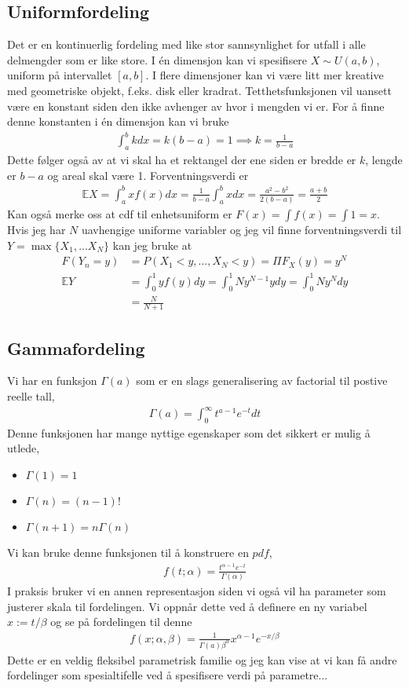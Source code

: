 \subsection{Uniformfordeling}
Det er en kontinuerlig fordeling med like stor sannsynlighet for utfall i alle delmengder som er like store. I én dimensjon kan vi spesifisere $X\sim U(a,b)$, uniform på intervallet $[a,b]$. I flere dimensjoner kan vi være litt mer kreative med geometriske objekt, f.eks. disk eller kradrat. Tetthetsfunksjonen vil uansett være en konstant siden den ikke avhenger av hvor i mengden vi er. For å finne denne konstanten i én dimensjon kan vi bruke
\begin{align}
\int_a^b k dx = k(b-a)=1 \implies k = \frac{1}{b-a}
\end{align}
Dette følger også av at vi skal ha et rektangel der ene siden er bredde er $k$, lengde er $b-a$ og areal skal være 1. Forventningsverdi er
\begin{align}
\mathbb{E}X = \int_a^b x f(x)dx = \frac{1}{b-a} \int_a^b x dx = \frac{a^2-b^2}{2(b-a)} = \frac{a+b}{2}
\end{align}
Kan også merke oss at cdf til enhetsuniform er $F(x) = \int f(x) = \int 1 = x$. Hvis jeg har $N$ uavhengige uniforme variabler og jeg vil finne forventningsverdi til $Y=\max\{X_1,...X_N\}$ kan jeg bruke at
\begin{align}
F(Y_n=y) &= P(X_1<y,...,X_N<y) = \Pi F_X(y)=y^N \\
\mathbb{E}Y &= \int_0^1 y f(y)dy = \int_0^1 Ny^{N-1}ydy = \int_0^1 Ny^{N}dy \\
&= \frac{N}{N+1}
\end{align}
\subsection{Gammafordeling}
Vi har en funksjon $\Gamma(a)$ som er en slags generalisering av factorial til postive reelle tall,
\begin{align}
\Gamma(a)=\int_0^{\infty}t^{a-1}e^{-t}dt
\end{align}
Denne funksjonen har mange nyttige egenskaper som det sikkert er mulig å utlede,
\begin{itemize}
\item $\Gamma(1)=1$
\item $\Gamma(n)=(n-1)!$
\item $\Gamma(n+1) = n\Gamma(n)$
\end{itemize}
Vi kan bruke denne funksjonen til å konstruere en $pdf$,
\begin{align}
f(t;\alpha) = \frac{t^{\alpha-1}e^{-t}}{\Gamma(\alpha)}
\end{align}
I praksis bruker vi en annen representasjon siden vi også vil ha parameter som justerer skala til fordelingen. Vi oppnår dette ved å definere en ny variabel $x:=t/\beta$ og se på fordelingen til denne
\begin{align}
f(x;\alpha,\beta)=\frac{1}{\Gamma(a)\beta^\alpha}x^{\alpha-1}e^{-x/\beta}
\end{align}
Dette er en veldig fleksibel parametrisk familie og jeg kan vise at vi kan få andre fordelinger som spesialtifelle ved å spesifisere verdi på parametre...
